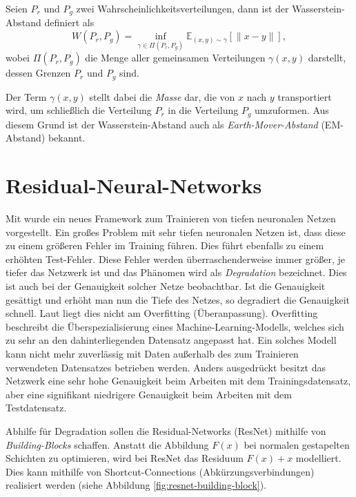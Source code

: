 \begin{definition}
Seien $P_r$ und $P_g$ zwei Wahrscheinlichkeitsverteilungen, dann ist der
Wasserstein-Abstand definiert als
\[
    W(P_r, P_g) = \inf_{\gamma \in \Pi(P_r, P_g)} \mathbb{E}_{(x, y) \sim \gamma} \left[\|x - y\|\right],
\]
wobei $\Pi(P_r, P_g)$ die Menge aller gemeinsamen Verteilungen $\gamma(x,
y)$ darstellt, dessen Grenzen $P_r$ und $P_g$ sind.
\end{definition}

Der Term $\gamma(x, y)$ stellt dabei die \textit{Masse} dar, die von $x$ nach
$y$ transportiert wird, um schließlich die Verteilung $P_r$ in die Verteilung
$P_g$ umzuformen. Aus diesem Grund ist der Wasserstein-Abstand auch als
\textit{Earth-Mover-Abstand} (EM-Abstand) bekannt.

\section{Residual-Neural-Networks}
Mit \cite{he2015deep} wurde ein neues Framework zum Trainieren von tiefen
neuronalen Netzen vorgestellt. Ein großes Problem mit sehr tiefen neuronalen
Netzen ist, dass diese zu einem größeren Fehler im Training führen. Dies führt
ebenfalls zu einem erhöhten Test-Fehler. Diese Fehler werden überraschenderweise
immer größer, je tiefer das Netzwerk ist und das Phänomen wird als
\textit{Degradation} bezeichnet. Dies ist auch bei der Genauigkeit solcher Netze
beobachtbar. Ist die Genauigkeit gesättigt und erhöht man nun die Tiefe des
Netzes, so degradiert die Genauigkeit schnell. Laut \cite{he2015deep} liegt dies
nicht am Overfitting (Überanpassung). Overfitting beschreibt die
Überspezialisierung eines Machine-Learning-Modells, welches sich zu sehr an den
dahinterliegenden Datensatz angepasst hat. Ein solches Modell kann nicht mehr
zuverlässig mit Daten außerhalb des zum Trainieren verwendeten Datensatzes
betrieben werden. Anders ausgedrückt besitzt das Netzwerk eine sehr hohe
Genauigkeit beim Arbeiten mit dem Trainingsdatensatz, aber eine signifikant
niedrigere Genauigkeit beim Arbeiten mit dem Testdatensatz.

Abhilfe für Degradation sollen die Residual-Networks (ResNet) mithilfe von
\textit{Building-Blocks} schaffen. Anstatt die Abbildung
$F(x)$ bei normalen gestapelten Schichten zu optimieren, wird bei ResNet das
Residuum $F(x) + x$ modelliert. Dies kann mithilfe von Shortcut-Connections
(Abkürzungsverbindungen) realisiert werden (siehe Abbildung
\ref{fig:resnet-building-block}).

